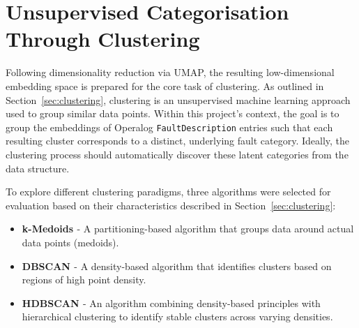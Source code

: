 \documentclass[10pt,oneside]{report}
\begin{document}

\section{Unsupervised Categorisation Through Clustering}\label{sec:unsupcat}

Following dimensionality reduction via UMAP, the resulting low-dimensional embedding space is prepared for the core task of clustering. As outlined in Section~\ref{sec:clustering}, clustering is an unsupervised machine learning approach used to group similar data points. Within this project's context, the goal is to group the embeddings of Operalog \texttt{FaultDescription} entries such that each resulting cluster corresponds to a distinct, underlying fault category. Ideally, the clustering process should automatically discover these latent categories from the data structure.

To explore different clustering paradigms, three algorithms were selected for evaluation based on their characteristics described in Section~\ref{sec:clustering}:

\begin{itemize}
    \item \textbf{k-Medoids \cite{kmedoids}} - A partitioning-based algorithm that groups data around actual data points (medoids).
    \item \textbf{DBSCAN \cite{ester1996density}} - A density-based algorithm that identifies clusters based on regions of high point density.
    \item \textbf{HDBSCAN \cite{campello2013density}} - An algorithm combining density-based principles with hierarchical clustering to identify stable clusters across varying densities.
\end{itemize}
\end{document}
